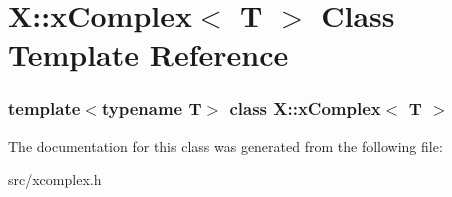 \hypertarget{class_x_1_1x_complex}{\section{X\-:\-:x\-Complex$<$ T $>$ Class Template Reference}
\label{class_x_1_1x_complex}
}
\subsubsection*{template$<$typename T$>$ class X\-::x\-Complex$<$ T $>$}



The documentation for this class was generated from the following file\-:\begin{DoxyCompactItemize}
\item 
src/xcomplex.\-h\end{DoxyCompactItemize}

